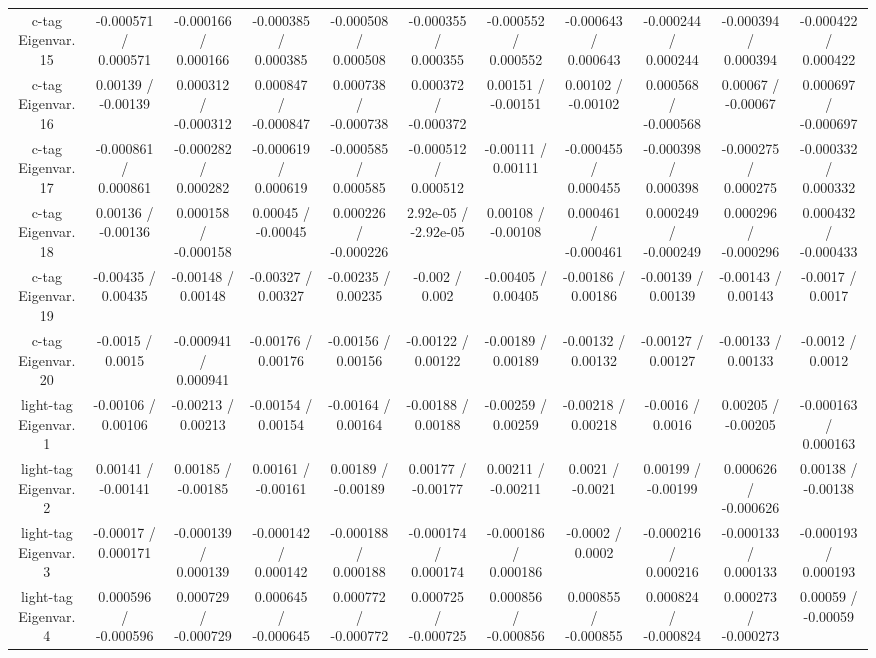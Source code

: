 \begin{table}[htbp]
\begin{center}
\begin{tabular}{|c|c|c|c|c|c|c|c|c|c|c|}
  c-tag Eigenvar. 15 & -0.000571 / 0.000571 & -0.000166 / 0.000166 & -0.000385 / 0.000385 & -0.000508 / 0.000508 & -0.000355 / 0.000355 & -0.000552 / 0.000552 & -0.000643 / 0.000643 & -0.000244 / 0.000244 & -0.000394 / 0.000394 & -0.000422 / 0.000422 \\ 
  c-tag Eigenvar. 16 & 0.00139 / -0.00139 & 0.000312 / -0.000312 & 0.000847 / -0.000847 & 0.000738 / -0.000738 & 0.000372 / -0.000372 & 0.00151 / -0.00151 & 0.00102 / -0.00102 & 0.000568 / -0.000568 & 0.00067 / -0.00067 & 0.000697 / -0.000697 \\ 
  c-tag Eigenvar. 17 & -0.000861 / 0.000861 & -0.000282 / 0.000282 & -0.000619 / 0.000619 & -0.000585 / 0.000585 & -0.000512 / 0.000512 & -0.00111 / 0.00111 & -0.000455 / 0.000455 & -0.000398 / 0.000398 & -0.000275 / 0.000275 & -0.000332 / 0.000332 \\ 
  c-tag Eigenvar. 18 & 0.00136 / -0.00136 & 0.000158 / -0.000158 & 0.00045 / -0.00045 & 0.000226 / -0.000226 & 2.92e-05 / -2.92e-05 & 0.00108 / -0.00108 & 0.000461 / -0.000461 & 0.000249 / -0.000249 & 0.000296 / -0.000296 & 0.000432 / -0.000433 \\ 
  c-tag Eigenvar. 19 & -0.00435 / 0.00435 & -0.00148 / 0.00148 & -0.00327 / 0.00327 & -0.00235 / 0.00235 & -0.002 / 0.002 & -0.00405 / 0.00405 & -0.00186 / 0.00186 & -0.00139 / 0.00139 & -0.00143 / 0.00143 & -0.0017 / 0.0017 \\ 
  c-tag Eigenvar. 20 & -0.0015 / 0.0015 & -0.000941 / 0.000941 & -0.00176 / 0.00176 & -0.00156 / 0.00156 & -0.00122 / 0.00122 & -0.00189 / 0.00189 & -0.00132 / 0.00132 & -0.00127 / 0.00127 & -0.00133 / 0.00133 & -0.0012 / 0.0012 \\ 
  light-tag Eigenvar. 1 & -0.00106 / 0.00106 & -0.00213 / 0.00213 & -0.00154 / 0.00154 & -0.00164 / 0.00164 & -0.00188 / 0.00188 & -0.00259 / 0.00259 & -0.00218 / 0.00218 & -0.0016 / 0.0016 & 0.00205 / -0.00205 & -0.000163 / 0.000163 \\ 
  light-tag Eigenvar. 2 & 0.00141 / -0.00141 & 0.00185 / -0.00185 & 0.00161 / -0.00161 & 0.00189 / -0.00189 & 0.00177 / -0.00177 & 0.00211 / -0.00211 & 0.0021 / -0.0021 & 0.00199 / -0.00199 & 0.000626 / -0.000626 & 0.00138 / -0.00138 \\ 
  light-tag Eigenvar. 3 & -0.00017 / 0.000171 & -0.000139 / 0.000139 & -0.000142 / 0.000142 & -0.000188 / 0.000188 & -0.000174 / 0.000174 & -0.000186 / 0.000186 & -0.0002 / 0.0002 & -0.000216 / 0.000216 & -0.000133 / 0.000133 & -0.000193 / 0.000193 \\ 
  light-tag Eigenvar. 4 & 0.000596 / -0.000596 & 0.000729 / -0.000729 & 0.000645 / -0.000645 & 0.000772 / -0.000772 & 0.000725 / -0.000725 & 0.000856 / -0.000856 & 0.000855 / -0.000855 & 0.000824 / -0.000824 & 0.000273 / -0.000273 & 0.00059 / -0.00059 \\ 

\end{tabular}
\end{center}
\end{table}
